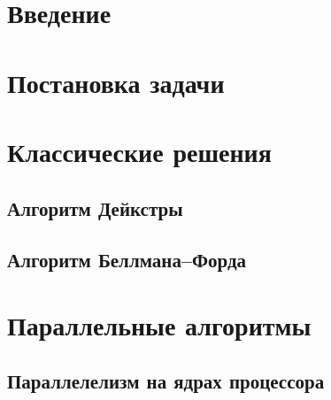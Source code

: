 

\usepackage[utf8]{inputenc}                %
\usepackage[T1,T2A]{fontenc}
\usepackage[main=russian, english]{babel}  %
\usepackage[pdftex]{graphicx}              %
\usepackage{indentfirst}                   %

\usepackage[unicode]{hyperref}                                         %


    
    \tableofcontents
    \clearpage

    \section{Введение}
    \section{Постановка задачи}
    \section{Классические решения}
        \subsection{Алгоритм Дейкстры}
        \subsection{Алгоритм Беллмана--Форда}
    \section{Параллельные алгоритмы}
        \subsection{Параллелелизм на ядрах процессора}
